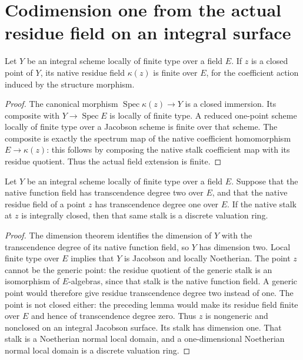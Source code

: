 \section{Codimension one from the actual residue field on an integral surface}
\begin{lemma}\label{lem:scheme-closed-point-residue-finite}
Let $Y$ be an integral scheme locally of finite type over a field $E$. If $z$ is a closed point of $Y$, its native residue field $\kappa(z)$ is finite over $E$, for the coefficient action induced by the structure morphism.
\leanok
\end{lemma}
\begin{proof}
The canonical morphism $\operatorname{Spec}\kappa(z)\to Y$ is a closed immersion. Its composite with $Y\to\operatorname{Spec}E$ is locally of finite type. A reduced one-point scheme locally of finite type over a Jacobson scheme is finite over that scheme. The composite is exactly the spectrum map of the native coefficient homomorphism $E\to\kappa(z)$: this follows by composing the native stalk coefficient map with its residue quotient. Thus the actual field extension is finite.
\end{proof}
\begin{theorem}\label{thm:scheme-surface-residue-dvr}
Let $Y$ be an integral scheme locally of finite type over a field $E$. Suppose that the native function field has transcendence degree two over $E$, and that the native residue field of a point $z$ has transcendence degree one over $E$. If the native stalk at $z$ is integrally closed, then that same stalk is a discrete valuation ring.
\leanok
\end{theorem}
\begin{proof}
The dimension theorem identifies the dimension of $Y$ with the transcendence degree of its native function field, so $Y$ has dimension two. Local finite type over $E$ implies that $Y$ is Jacobson and locally Noetherian. The point $z$ cannot be the generic point: the residue quotient of the generic stalk is an isomorphism of $E$-algebras, since that stalk is the native function field. A generic point would therefore give residue transcendence degree two instead of one. The point is not closed either: the preceding lemma would make its residue field finite over $E$ and hence of transcendence degree zero. Thus $z$ is nongeneric and nonclosed on an integral Jacobson surface. Its stalk has dimension one. That stalk is a Noetherian normal local domain, and a one-dimensional Noetherian normal local domain is a discrete valuation ring.
\end{proof}
